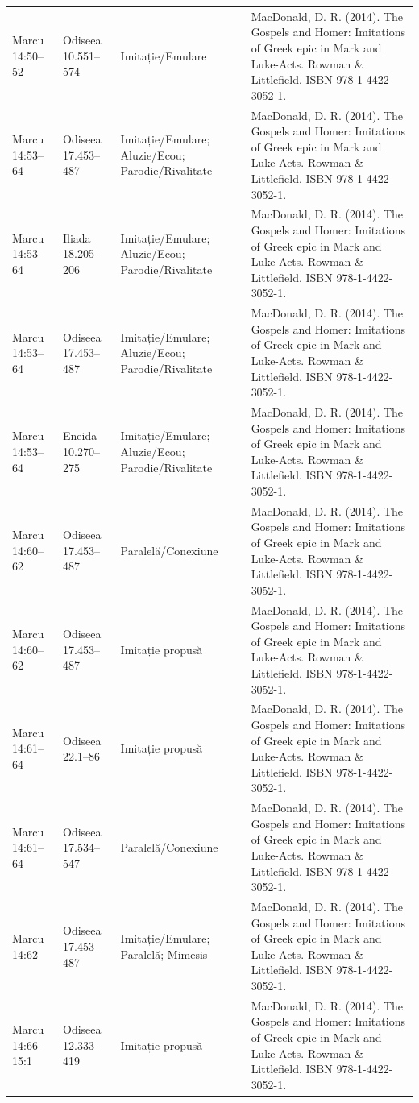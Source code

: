 \documentclass[12pt,a4paper,twoside,openany]{book}
\begin{document}
\begin{longtable}{L{1.4cm}L{1.7cm}L{3.1cm}L{8.4cm}}
Marcu 14:50–52 & Odiseea 10.551–574 & Imitație/Emulare & MacDonald, D. R. (2014). The Gospels and Homer: Imitations of Greek epic in Mark and Luke-Acts. Rowman \& Littlefield. ISBN 978-1-4422-3052-1. \\
Marcu 14:53–64 & Odiseea 17.453–487 & Imitație/Emulare; Aluzie/Ecou; Parodie/Rivalitate & MacDonald, D. R. (2014). The Gospels and Homer: Imitations of Greek epic in Mark and Luke-Acts. Rowman \& Littlefield. ISBN 978-1-4422-3052-1. \\
Marcu 14:53–64 & Iliada 18.205–206 & Imitație/Emulare; Aluzie/Ecou; Parodie/Rivalitate & MacDonald, D. R. (2014). The Gospels and Homer: Imitations of Greek epic in Mark and Luke-Acts. Rowman \& Littlefield. ISBN 978-1-4422-3052-1. \\
Marcu 14:53–64 & Odiseea 17.453–487 & Imitație/Emulare; Aluzie/Ecou; Parodie/Rivalitate & MacDonald, D. R. (2014). The Gospels and Homer: Imitations of Greek epic in Mark and Luke-Acts. Rowman \& Littlefield. ISBN 978-1-4422-3052-1. \\
Marcu 14:53–64 & Eneida 10.270–275 & Imitație/Emulare; Aluzie/Ecou; Parodie/Rivalitate & MacDonald, D. R. (2014). The Gospels and Homer: Imitations of Greek epic in Mark and Luke-Acts. Rowman \& Littlefield. ISBN 978-1-4422-3052-1. \\
Marcu 14:60–62 & Odiseea 17.453–487 & Paralelă/Conexiune & MacDonald, D. R. (2014). The Gospels and Homer: Imitations of Greek epic in Mark and Luke-Acts. Rowman \& Littlefield. ISBN 978-1-4422-3052-1. \\
Marcu 14:60–62 & Odiseea 17.453–487 & Imitație propusă & MacDonald, D. R. (2014). The Gospels and Homer: Imitations of Greek epic in Mark and Luke-Acts. Rowman \& Littlefield. ISBN 978-1-4422-3052-1. \\
Marcu 14:61–64 & Odiseea 22.1–86 & Imitație propusă & MacDonald, D. R. (2014). The Gospels and Homer: Imitations of Greek epic in Mark and Luke-Acts. Rowman \& Littlefield. ISBN 978-1-4422-3052-1. \\
Marcu 14:61–64 & Odiseea 17.534–547 & Paralelă/Conexiune & MacDonald, D. R. (2014). The Gospels and Homer: Imitations of Greek epic in Mark and Luke-Acts. Rowman \& Littlefield. ISBN 978-1-4422-3052-1. \\
Marcu 14:62 & Odiseea 17.453–487 & Imitație/Emulare; Paralelă; Mimesis & MacDonald, D. R. (2014). The Gospels and Homer: Imitations of Greek epic in Mark and Luke-Acts. Rowman \& Littlefield. ISBN 978-1-4422-3052-1. \\
Marcu 14:66–15:1 & Odiseea 12.333–419 & Imitație propusă & MacDonald, D. R. (2014). The Gospels and Homer: Imitations of Greek epic in Mark and Luke-Acts. Rowman \& Littlefield. ISBN 978-1-4422-3052-1. \\

\end{longtable}
\end{document}
